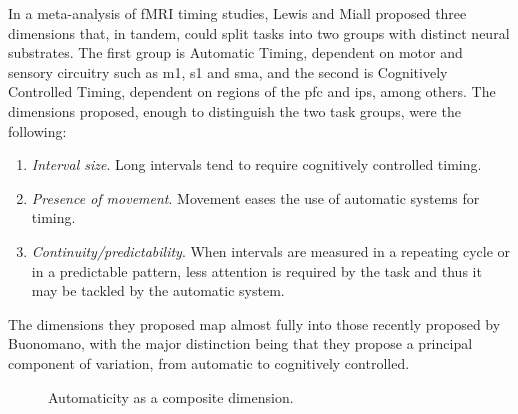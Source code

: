     In a meta-analysis of fMRI timing studies, Lewis and Miall \cite{lewis2003distinct} proposed three dimensions that, in tandem, could split tasks into two groups with distinct neural substrates. The first group is Automatic Timing, dependent on motor and sensory circuitry such as \ac{m1}, \ac{s1} and \ac{sma}, and the second is Cognitively Controlled Timing, dependent on regions of the \ac{pfc} and \ac{ips}, among others. The dimensions proposed, enough to distinguish the two task groups, were the following:
    \begin{enumerate}
        \item \textit{Interval size}. Long intervals tend to require cognitively controlled timing.
        \item \textit{Presence of movement}. Movement eases the use of automatic systems for timing.
        \item \textit{Continuity/predictability}. When intervals are measured in a repeating cycle or in a predictable pattern, less            attention is required by the task and thus it may be tackled by the automatic system.
    \end{enumerate}
    The dimensions they proposed map almost fully into those recently proposed by Buonomano, with the major distinction being that they propose a principal component of variation, from automatic to cognitively controlled. 
    
    \begin{figure}
        \centering
        \caption{Automaticity as a composite dimension.}
        \label{fig:automaticity}
    \end{figure}
    
    






